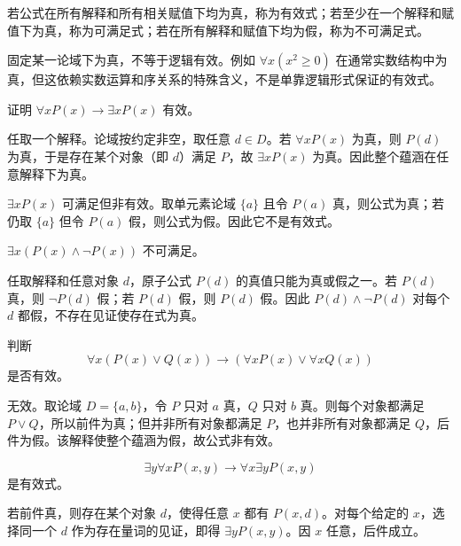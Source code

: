 \begin{definition}\label{ch2-valid-sat}
若公式在所有解释和所有相关赋值下均为真，称为有效式；若至少在一个解释和赋值下为真，称为可满足式；若在所有解释和赋值下均为假，称为不可满足式。
\end{definition}

固定某一论域下为真，不等于逻辑有效。例如 $\forall x(x^2\ge0)$ 在通常实数结构中为真，但这依赖实数运算和序关系的特殊含义，不是单靠逻辑形式保证的有效式。

\begin{example}[title={有效式证明}]\label{ch2-valid-example}
证明 $\forall xP(x)\to\exists xP(x)$ 有效。
\begin{solution}
任取一个解释。论域按约定非空，取任意 $d\in D$。若 $\forall xP(x)$ 为真，则 $P(d)$ 为真，于是存在某个对象（即 $d$）满足 $P$，故 $\exists xP(x)$ 为真。因此整个蕴涵在任意解释下为真。
\end{solution}
\end{example}

\begin{example}[title={可满足但非有效}]\label{ch2-sat-not-valid}
$\exists xP(x)$ 可满足但非有效。取单元素论域 $\{a\}$ 且令 $P(a)$ 真，则公式为真；若仍取 $\{a\}$ 但令 $P(a)$ 假，则公式为假。因此它不是有效式。
\end{example}

\begin{example}[title={不可满足公式}]\label{ch2-unsat-example}
$\exists x(P(x)\land\neg P(x))$ 不可满足。
\begin{solution}
任取解释和任意对象 $d$，原子公式 $P(d)$ 的真值只能为真或假之一。若 $P(d)$ 真，则 $\neg P(d)$ 假；若 $P(d)$ 假，则 $P(d)$ 假。因此 $P(d)\land\neg P(d)$ 对每个 $d$ 都假，不存在见证使存在式为真。
\end{solution}
\end{example}

\begin{example}[title={构造反解释证明非有效}]\label{ch2-countermodel}
判断
\[
\forall x(P(x)\lor Q(x))\to(\forall xP(x)\lor\forall xQ(x))
\]
是否有效。
\begin{solution}
无效。取论域 $D=\{a,b\}$，令 $P$ 只对 $a$ 真，$Q$ 只对 $b$ 真。则每个对象都满足 $P\lor Q$，所以前件为真；但并非所有对象都满足 $P$，也并非所有对象都满足 $Q$，后件为假。该解释使整个蕴涵为假，故公式非有效。
\end{solution}
\end{example}

\begin{example}[title={量词次序公式的有效性}]\label{ch2-order-valid}
\[
\exists y\forall xP(x,y)\to\forall x\exists yP(x,y)
\]
是有效式。
\begin{solution}
若前件真，则存在某个对象 $d$，使得任意 $x$ 都有 $P(x,d)$。对每个给定的 $x$，选择同一个 $d$ 作为存在量词的见证，即得 $\exists yP(x,y)$。因 $x$ 任意，后件成立。
\end{solution}
\end{example}

